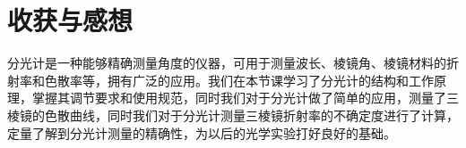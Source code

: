 \documentclass[a4 paper,12pt]{article}
\begin{document}
\section{收获与感想}
分光计是一种能够精确测量角度的仪器，可用于测量波长、棱镜角、棱镜材料的折射率和色散率等，拥有广泛的应用。我们在本节课学习了分光计的结构和工作原理，掌握其调节要求和使用规范，同时我们对于分光计做了简单的应用，测量了三棱镜的色散曲线，同时我们对于分光计测量三棱镜折射率的不确定度进行了计算，定量了解到分光计测量的精确性，为以后的光学实验打好良好的基础。
\end{document}
